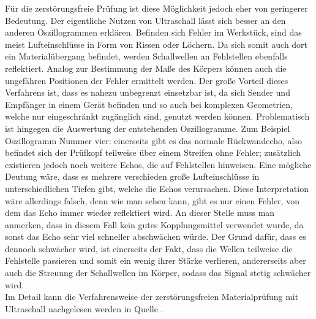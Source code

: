 \documentclass[reducespace,stylepage,semiarbeit]{spezidoc}
\begin{document}
Für die zerstörungsfreie Prüfung ist diese Möglichkeit jedoch eher von geringerer Bedeutung. Der eigentliche Nutzen von Ultraschall lässt sich besser an den anderen Oszillogrammen erklären. Befinden sich Fehler im Werkstück, sind das meist Lufteinschlüsse in Form von Rissen oder Löchern. Da sich somit auch dort ein Materialübergang befindet, werden Schallwellen an Fehlstellen ebenfalls reflektiert. Analog zur Bestimmung der Maße des Körpers können auch die ungefähren Positionen der Fehler ermittelt werden. Der große Vorteil dieses Verfahrens ist, dass es nahezu unbegrenzt einsetzbar ist, da sich Sender und Empfänger in einem Gerät befinden und so auch bei komplexen Geometrien, welche nur eingeschränkt zugänglich sind, genutzt werden können. Problematisch ist hingegen die Auswertung der entstehenden Oszillogramme. Zum Beispiel Oszillogramm Nummer vier: einerseits gibt es das normale Rückwandecho, also befindet sich der Prüfkopf teilweise über einem Streifen ohne Fehler; zusätzlich existieren jedoch noch weitere Echos, die auf Fehlstellen hinweisen. Eine mögliche Deutung wäre, dass es mehrere verschieden große Lufteinschlüsse in unterschiedlichen Tiefen gibt, welche die Echos verursachen. Diese Interpretation wäre allerdings falsch, denn wie man sehen kann, gibt es nur einen Fehler, von dem das Echo immer wieder reflektiert wird. An dieser Stelle muss man anmerken, dass in diesem Fall kein gutes Kopplungsmittel verwendet wurde, da sonst das Echo sehr viel schneller abschwächen würde. Der Grund dafür, dass es dennoch schwächer wird, ist einerseits der Fakt, dass die Wellen teilweise die Fehlstelle passieren und somit ein wenig ihrer Stärke verlieren, andererseits aber auch die Streuung der Schallwellen im Körper, sodass das Signal stetig schwächer wird.\\
Im Detail kann die Verfahrensweise der zerstörungsfreien Materialprüfung mit Ultraschall nachgelesen werden in Quelle \cite{karldeutsch}.
\end{document}
